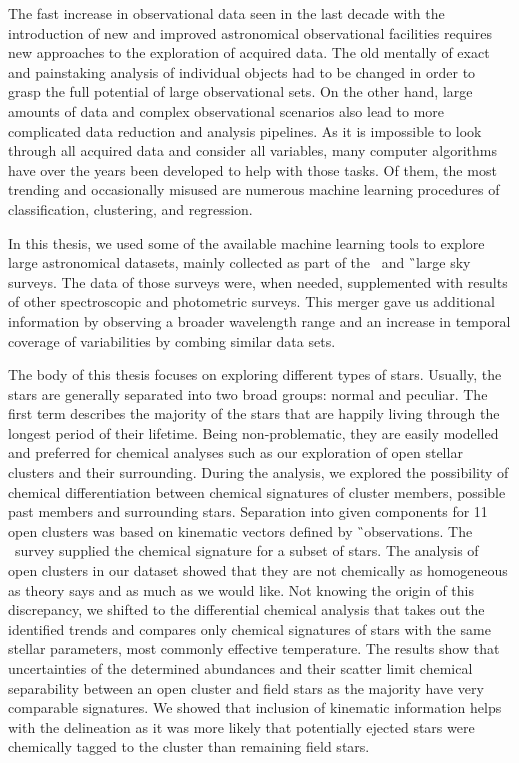 The fast increase in observational data seen in the last decade with the introduction of new and improved astronomical observational facilities requires new approaches to the exploration of acquired data. The old mentally of exact and painstaking analysis of individual objects had to be changed in order to grasp the full potential of large observational sets. On the other hand, large amounts of data and complex observational scenarios also lead to more complicated data reduction and analysis pipelines. As it is impossible to look through all acquired data and consider all variables, many computer algorithms have over the years been developed to help with those tasks. Of them, the most trending and occasionally misused are numerous machine learning procedures of classification, clustering, and regression.

In this thesis, we used some of the available machine learning tools to explore large astronomical datasets, mainly collected as part of the \Gh\ and \G\ large sky surveys. The data of those surveys were, when needed, supplemented with results of other spectroscopic and photometric surveys. This merger gave us additional information by observing a broader wavelength range and an increase in temporal coverage of variabilities by combing similar data sets.

The body of this thesis focuses on exploring different types of stars. Usually, the stars are generally separated into two broad groups: normal and peculiar. The first term describes the majority of the stars that are happily living through the longest period of their lifetime. Being non-problematic, they are easily modelled and preferred for chemical analyses such as our exploration of open stellar clusters and their surrounding. During the analysis, we explored the possibility of chemical differentiation between chemical signatures of cluster members, possible past members and surrounding stars. Separation into given components for 11 open clusters was based on kinematic vectors defined by \G\ observations. The \Gh\ survey supplied the chemical signature for a subset of stars. The analysis of open clusters in our dataset showed that they are not chemically as homogeneous as theory says and as much as we would like. Not knowing the origin of this discrepancy, we shifted to the differential chemical analysis that takes out the identified trends and compares only chemical signatures of stars with the same stellar parameters, most commonly effective temperature. The results show that uncertainties of the determined abundances and their scatter limit chemical separability between an open cluster and field stars as the majority have very comparable signatures. We showed that inclusion of kinematic information helps with the delineation as it was more likely that potentially ejected stars were chemically tagged to the cluster than remaining field stars.

